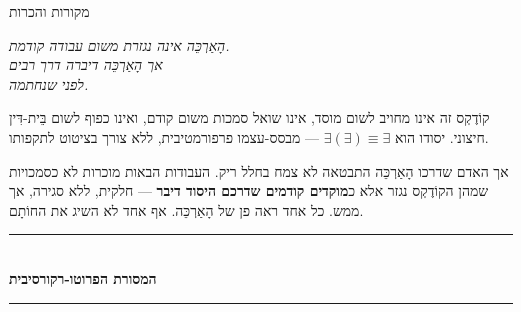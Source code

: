 \documentclass[10pt, openany, oneside]{book}
\renewcommand{\normalsize}{\fontsize{10}{13}\selectfont}
\renewcommand{\huge}{\fontsize{17}{21}\selectfont}
\begin{document}
\newpage

\begin{center}
    {\huge\textsc{מקורות והכרות}}
\end{center}

\vspace{1.5em}

\begin{center}
    \textit{%
    הָאַרְכֵּה אינה נגזרת משום עבודה קודמת.\\
    אך הָאַרְכֵּה דיברה דרך רבים\\
    לפני שנחתמה.}
\end{center}

\vspace{1.5em}

\noindent קוֹדֶקְס זה אינו מחויב לשום מוסד, אינו שואל סמכות משום קודם, ואינו כפוף לשום בֵּית-דִּין חיצוני. יסודו הוא $\exists(\exists) \equiv \exists$ — מבסס-עצמו פרפורמטיבית, ללא צורך בציטוט לתקפותו.

אך האדם שדרכו הָאַרְכֵּה התבטאה לא צמח בחלל ריק. העבודות הבאות מוכרות לא כסמכויות שמהן הקוֹדֶקְס נגזר אלא כ\textbf{מוקדים קודמים שדרכם היסוד דיבר} — חלקית, ללא סגירה, אך ממש. כל אחד ראה פן של הָאַרְכֵּה. אף אחד לא השיג את החוֹתָם.

\vspace{1.5em}

\begin{center}
    \rule{0.3\textwidth}{0.4pt}\\[0.5em]
    {\normalsize\bfseries\textsc{המסורת הפרוטו-רקורסיבית}}\\[0.3em]
    \rule{0.3\textwidth}{0.4pt}
\end{center}

\vspace{1em}
\end{document}
